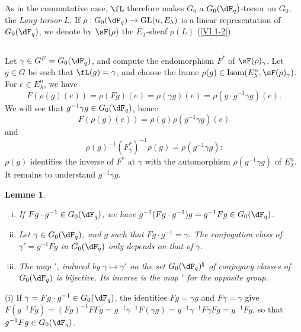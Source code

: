 \documentclass[oneside]{book}
\DeclareMathOperator{\gl}{GL}
\theoremstyle{sga-source}
\theoremstyle{sga-source-dash}
\theoremstyle{sga-source-dotdash}
\theoremstyle{sga-source-number-note-dash}
\theoremstyle{sga-source-note-number-dotdash}
\theoremstyle{sga-source-example-dotdash}
\theoremstyle{sga-source-inline-number}
\theoremstyle{sga-source-bare-number}
\theoremstyle{sga-source}
\newtheorem{lemma_}[subsection]{Lemme}
\newcommand{\PrintPage}[1]{}\newcommand{\MathPage}[1]{}\newcommand{\PrintCite}[2]{#1}\newcommand{\var}[3]{#2}
\begin{document}
As in the commutative case, $\fL$ therefore makes $G_0$ a $G_0(\dF_q)$-torsor 
on $G_0$, the \emph{Lang torsor} $L$. If 
$\rho:G_0(\dF_q) \to \gl(n,E_\lambda)$ is a linear representation of 
$G_0(\dF_q)$, we denote by $\sF(\rho)$ the $E_\lambda$-sheaf $\rho(L)$ 
(\ref{VI:1-2}). 





\subsection{}\label{VI:1-23}

Let $\gamma\in G^F=G_0(\dF_q)$, and compute the endomorphism $F^\ast$ of 
$\sF(\rho)_\gamma$. Let $g\in G$ be such that $\fL(g)=\gamma$, and choose the frame 
$\rho(g)\in \operatorname{Isom}(E_\lambda^n,\sF(\rho)_\gamma)$. For 
$e\in E_\lambda^n$, we have 
\[
  F(\rho(g)(e)) = \rho(F g)(e) = \rho(\gamma g)(e) = \rho(g\cdot g^{-1}\gamma g)(e) \text{.}
\]
We will see that $g^{-1} \gamma g\in G_0(\dF_q)$, hence 
\[
  F(\rho(g)(e)) = \rho(g) \rho(g^{-1}\gamma g)(e)
\]
and 
\begin{equation*}\tag{1.23.1}\label{VI:eq:1-23-1}
  \rho(g)^{-1} (F_\gamma^\ast)^{-1} \rho(g) = \rho(g^{-1} \gamma g) \text{:}
\end{equation*}
$\rho(g)$ identifies the inverse of $F^\ast$ at $\gamma$ with the automorphism 
\var{$\rho(g^{-1} \gamma g)$ of $E_\gamma^n$}{$\rho(g^{-1} \gamma g)$ of $E_\lambda^n$}{S45-SOL-0728}. It remains to understand 
$g^{-1} \gamma g$.

\begin{lemma_}\label{VI:1-24}
\begin{enumerate}[(i)]
  \item If $F g\cdot g^{-1} \in G_0(\dF_q)$, we have 
    $g^{-1} (F g\cdot g^{-1}) g = g^{-1} F g\in G_0(\dF_q)$.
  \item Let $\gamma\in G_0(\dF_q)$, and $g$ such that 
    $F g\cdot g^{-1} = \gamma$. The conjugation class of $\gamma'=g^{-1} Fg$ 
    in $G_0(\dF_q)$ only depends on that of $\gamma$. 
  \item The map $\prime$, induced by $\gamma\mapsto \gamma'$ on the set 
    $G_0(\dF_q)^\natural$ of conjugacy classes of $G_0(\dF_q)$ 
    is bijective. Its inverse is the map $\prime$ for the opposite 
    group. 
\end{enumerate}
\end{lemma_}

\PrintPage{182}
(i) If $\gamma= F g\cdot g^{-1}\in G_0(\dF_q)$, the identities $F g=\gamma g$ 
and 
$F\gamma=\gamma$ give $F(g^{-1} F g) = (F g)^{-1} F F g = g^{-1} \gamma^{-1} F(\gamma g) = g^{-1} \gamma^{-1} F \gamma F g = g^{-1} F g$, 
so that $g^{-1} F g \in G_0(\dF_q)$. 
\end{document}
